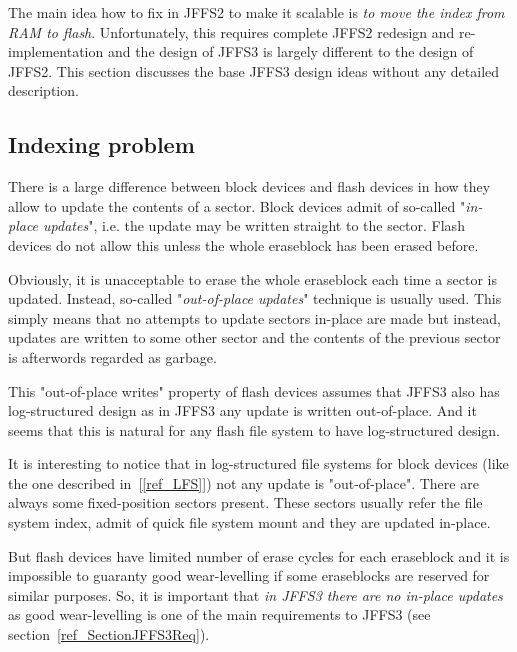 %
%
%
%

The main idea how to fix in JFFS2 to make it scalable is \emph{to move the
index from RAM to flash}. Unfortunately, this requires complete JFFS2 redesign
and \mbox{re-implementation} and the design of JFFS3 is largely different to
the design of JFFS2. This section discusses the base JFFS3 design ideas without
any detailed description.

%
%
\subsection{Indexing problem}

There is a large difference between block devices and flash devices in how they
allow to update the contents of a sector. Block devices admit of
\mbox{so-called} "\emph{\mbox{in-place} updates}", i.e. the update may be
written straight to the sector. Flash devices do not allow this unless the
whole eraseblock has been erased before.

Obviously, it is unacceptable to erase the whole eraseblock each time a sector
is updated. Instead, \mbox{so-called} "\emph{\mbox{out-of-place} updates}"
technique is usually used. This simply means that no attempts to update
sectors \mbox{in-place} are made but instead, updates are written to some
other sector and the contents of the previous sector is afterwords regarded as
garbage.

This "\mbox{out-of-place} writes" property of flash devices assumes that JFFS3
also has \mbox{log-structured} design as in JFFS3 any update is written
\mbox{out-of-place}. And it seems that this is natural for any flash file
system to have log-structured design.

It is interesting to notice that in \mbox{log-structured} file systems for
block devices (like the one described in~[\ref{ref_LFS}]) not any update is
"\mbox{out-of-place}". There are always some \mbox{fixed-position} sectors
present. These sectors usually refer the file system index, admit of quick
file system mount and they are updated \mbox{in-place}.

But flash devices have limited number of erase cycles for each eraseblock and
it is impossible to guaranty good \mbox{wear-levelling} if some eraseblocks are
reserved for similar purposes. So, it is important that \emph{in JFFS3 there
are no \mbox{in-place} updates} as good \mbox{wear-levelling} is one of the
main requirements to JFFS3 (see section~\ref{ref_SectionJFFS3Req}).

